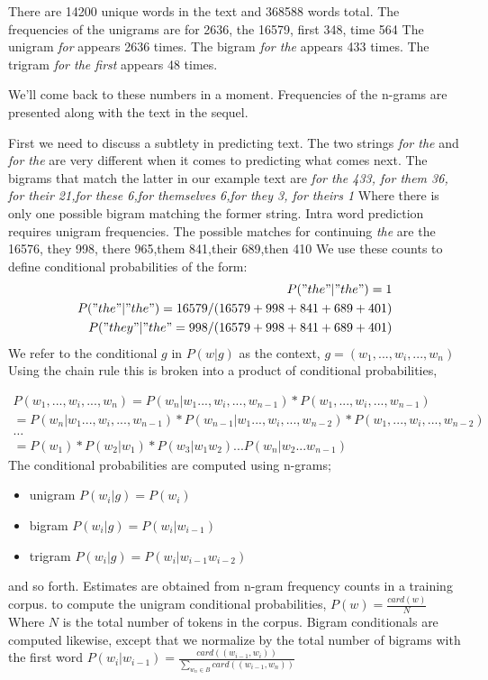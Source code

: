 There are 14200 unique words in the text and 368588 words total.  The frequencies of the unigrams are
{for 2636, the 16579, first 348, time 564}
The unigram \emph{for} appears 2636 times.
The bigram \emph{for the} appears 433 times.
The trigram \emph{for the first} appears 48 times.

We'll come back to these numbers in a moment. Frequencies of the n-grams are presented along with the text in the sequel.

First we need to discuss a subtlety in predicting text.  The two strings \emph{for the} and \emph{for the } are very different when it comes to predicting what comes next.  The bigrams that match the latter in our example text are
\emph{{for the 433, for them 36, for their 21,for these 6,for themselves 6,for they 3, for theirs 1}}
Where there is only one possible bigram matching the former string. Intra word  prediction requires unigram frequencies. The possible matches for continuing \emph{the} are {the 16576, they 998, there 965,them 841,their 689,then 410} We use these counts to define conditional probabilities of the form:
\begin{eqnarray*}
P("the" | "the ") =1 \\
P("the" | "the") = 16579/(16579+998+841+689+401) \\
P("they" | "the" = 998/(16579+998+841+689+401)
\end{eqnarray*}
We refer to the conditional $g$ in $P(w|g)$ as the context, $ g= (w_{1}, ...,w_{i},...,w_{n})$  Using the chain rule this is broken into a product of conditional probabilities,

\begin{eqnarray*}
P(w_{1}, ...,w_{i},...,w_{n}) = P(w_{n}|w_{1} ...,w_{i},...,w_{n-1}) * P(w_{1}, ...,w_{i},...,w_{n-1}) \\
 = P(w_{n}|w_{1} ...,w_{i},...,w_{n-1}) * P(w_{n-1}|w_{1} ...,w_{i},...,w_{n-2}) * P(w_{1}, ...,w_{i},...,w_{n-2})\\
\ldots \\
= P(w_{1}) * P(w_{2} | w_{1}) * P(w_{3} | w_{1} w_{2}) ... P(w_{n} | w_{2} ...w_{n-1})
\end{eqnarray*}
The conditional probabilities are computed using n-grams;
\begin{itemize}
\item unigram $P(w_{i} | g) = P(w_{i})$ \\
\item bigram  $P(w_{i} | g) = P(w_{i} | w_{i-1})$ \\
\item trigram $P(w_{i} | g) =  P(w_{i} | w_{i-1} w_{i-2})$
\end{itemize}
and so forth.  Estimates are obtained from n-gram frequency counts in a training corpus.
to compute the unigram conditional probabilities, $P(w) =  \frac{card(w) }{N}$ Where $N$ is the total number of tokens in the corpus. Bigram conditionals are computed likewise, except that we normalize by the total number of bigrams with the first word $P(w_{i} | w_{i-1}) =  \frac{card( (w_{i-1},w_{i}) ) }{\sum\limits_{w_{n} \in B} card( (w_{i-1},w_{n}))}$

